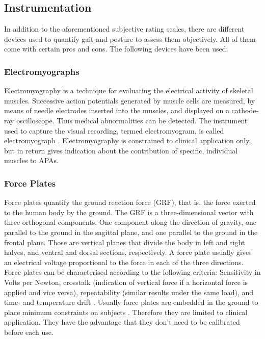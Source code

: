 \subsection{Instrumentation}

In addition to the aforementioned subjective rating scales, there are different devices used to quantify gait and posture to assess them objectively. All of them come with certain pros and cons. The following devices have been used:

\subsubsection{Electromyographs} Electromyography is a technique for evaluating the electrical activity of skeletal muscles. Successive action potentials generated by muscle cells are measured, by means of needle electrodes inserted into the muscles, and displayed on a cathode-ray oscilloscope. Thus medical abnormalities can be detected. The instrument used to capture the visual recording, termed electromyogram, is called electromyograph \cite{encyclopedia_britannica_electromyography_2014}. Electromyography is constrained to clinical application only, but in return gives indication about the contribution of specific, individual muscles to APAs.

\subsubsection{Force Plates} Force plates quantify the ground reaction force (GRF), that is, the force exerted to the human body by the ground. The GRF is a three-dimensional vector with three orthogonal components. One component along the direction of gravity, one parallel to the ground in the sagittal plane, and one parallel to the ground in the frontal plane. Those are vertical planes that divide the body in left and right halves, and ventral and dorsal sections, respectively. A force plate usually gives an electrical voltage proportional to the force in each of the three directions. Force plates can be characterised according to the following criteria: Sensitivity in Volts per Newton, crosstalk (indication of vertical force if a horizontal force is applied and vice versa), repeatability (similar results under the same load), and time- and temperature drift \cite{griffiths_principles_2006}. Usually force plates are embedded in the ground to place minimum constraints on subjects \cite{mancini_trunk_2011}. Therefore they are limited to clinical application. They have the advantage that they don't need to be calibrated before each use. 

